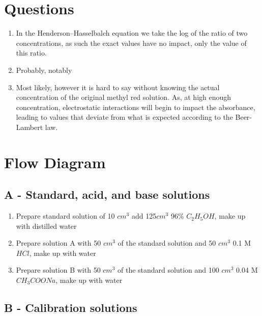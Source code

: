 \documentclass[a4paper, british]{article}
\begin{document}
\begin{appendices}

\section{Questions}

\begin{enumerate}
    \item In the Henderson–Hasselbalch equation we take the log of the ratio of two concentrations, as such the exact values have no impact, only the value of this ratio.
    \item Probably, notably
    \item Most likely, however it is hard to say without knowing the actual concentration of the original methyl red solution. As, at high enough concentration, electrostatic interactions will begin to impact the absorbance, leading to values that deviate from what is expected according to the Beer-Lambert law.
\end{enumerate}

\newpage

\section{Flow Diagram}

\subsection*{A - Standard, acid, and base solutions}

\begin{enumerate}
    \item Prepare standard solution of 10 \(cm^3\) add 125\(cm^3\) 96\% \(C_2 H_5 OH\), make up with distilled water
    \item Prepare solution A with 50 \(cm^3\) of the standard solution and 50 \(cm^3\) 0.1 M \(HCl\), make up with water
    \item Prepare solution B with 50 \(cm^3\) of the standard solution and 100 \(cm^3\) 0.04 M \(CH_3 COONa\), make up with water
\end{enumerate}

\subsection*{B - Calibration solutions}


\end{appendices}
\end{document}
